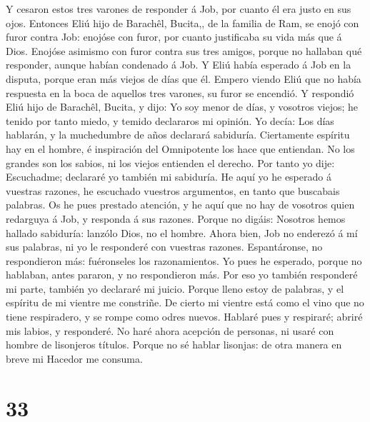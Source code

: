  Y cesaron estos tres varones de responder á Job, por cuanto
él era justo en sus ojos.  Entonces Eliú hijo de Barachêl,
Bucita,, de la familia de Ram, se enojó con furor contra Job: enojóse
con furor, por cuanto justificaba su vida más que á Dios. 
Enojóse asimismo con furor contra sus tres amigos, porque no hallaban
qué responder, aunque habían condenado á Job.  Y Eliú había
esperado á Job en la disputa, porque eran más viejos de días que él.
 Empero viendo Eliú que no había respuesta en la boca de
aquellos tres varones, su furor se encendió.  Y respondió
Eliú hijo de Barachêl, Bucita, y dijo: Yo soy menor de días, y vosotros
viejos; he tenido por tanto miedo, y temido declararos mi opinión.
 Yo decía: Los días hablarán, y la muchedumbre de años
declarará sabiduría.  Ciertamente espíritu hay en el hombre,
é inspiración del Omnipotente los hace que entiendan.  No
los grandes son los sabios, ni los viejos entienden el derecho.
 Por tanto yo dije: Escuchadme; declararé yo también mi
sabiduría.  He aquí yo he esperado á vuestras razones, he
escuchado vuestros argumentos, en tanto que buscabais palabras.
 Os he pues prestado atención, y he aquí que no hay de
vosotros quien redarguya á Job, y responda á sus razones. 
Porque no digáis: Nosotros hemos hallado sabiduría: lanzólo Dios, no el
hombre.  Ahora bien, Job no enderezó á mí sus palabras, ni
yo le responderé con vuestras razones.  Espantáronse, no
respondieron más: fuéronseles los razonamientos.  Yo pues
he esperado, porque no hablaban, antes pararon, y no respondieron más.
 Por eso yo también responderé mi parte, también yo
declararé mi juicio.  Porque lleno estoy de palabras, y el
espíritu de mi vientre me constriñe.  De cierto mi vientre
está como el vino que no tiene respiradero, y se rompe como odres
nuevos.  Hablaré pues y respiraré; abriré mis labios, y
responderé.  No haré ahora acepción de personas, ni usaré
con hombre de lisonjeros títulos.  Porque no sé hablar
lisonjas: de otra manera en breve mi Hacedor me consuma.

\hypertarget{section-32}{%
\section{33}\label{section-32}}


